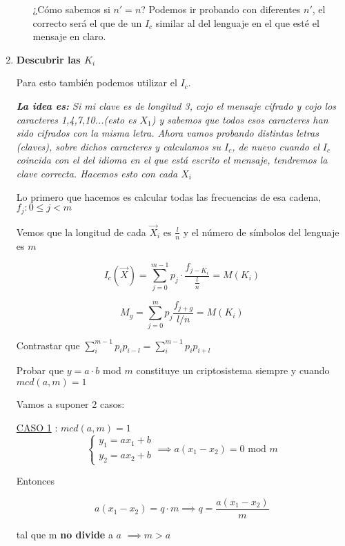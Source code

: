 \begin{enumerate}
\begin{itemize}
\begin{example}
		¿Cómo sabemos si $n' = n$? Podemos ir probando con diferentes $n'$, el correcto será el que de un $I_c$ similar al del lenguaje en el que esté el mensaje en claro.
	\end{example}
	
	\end{itemize}
	\item \textbf{Descubrir las $K_i$}
	
	Para esto también podemos utilizar el $I_c$.
	
	\textit{\textbf{La idea es:} Si mi clave es de longitud 3, cojo el mensaje cifrado y cojo los caracteres 1,4,7,10...(esto es $X_1$) y sabemos que todos esos caracteres han sido cifrados con la misma letra. Ahora vamos probando distintas letras (claves), sobre dichos caracteres y calculamos su $I_c$, de nuevo cuando el $I_c$ coincida con el del idioma en el que está escrito el mensaje, tendremos la clave correcta. Hacemos esto con cada $X_i$}
	
	Lo primero que hacemos es calcular todas las frecuencias de esa cadena, $f_j : 0 \leq j < m$
	
	Vemos que la longitud de cada $\overrightarrow{X}_i$ es $\frac{l}{n}$ y el número de símbolos del lenguaje es $m$
	
	$$I_c(\overrightarrow{X}) = \sum_{j=0}^{m-1} p_j \cdot \frac{f_{j-K_i}}{\frac{l}{n}} = M(K_i)$$
	
	$$M_g = \sum_{j=0}^{m} p_j \frac{f_{j+g}}{l/n} = M(K_i)$$ 
	\begin{example}
		
		Contrastar que $\sum_{i}^{m-1} p_i p_{i-l} = \sum_{i}^{m-1} p_i p_{i+l}$
		
	\end{example}
	
	\begin{problem}[5]
		Probar que $y = a\cdot b$ mod $m$ constituye un criptosistema siempre y cuando $mcd(a,m) = 1$
		
		\solution
		Vamos a suponer 2 casos:
		
		\underline{CASO 1} : $mcd(a,m) = 1$
		$$\begin{cases}
		y_1 = ax_1 + b\\y_2= ax_2 +b
		\end{cases} \implies a(x_1 - x_2) = 0 \text{ mod } m $$
		
		Entonces
		
		$$a(x_1 - x_2) = q \cdot m \implies q = \frac{a(x_1 -x_2)}{m}$$
		
		tal que m \textbf{no divide} a $a$ $\implies m>a$
		

\end{problem}
\end{enumerate}
